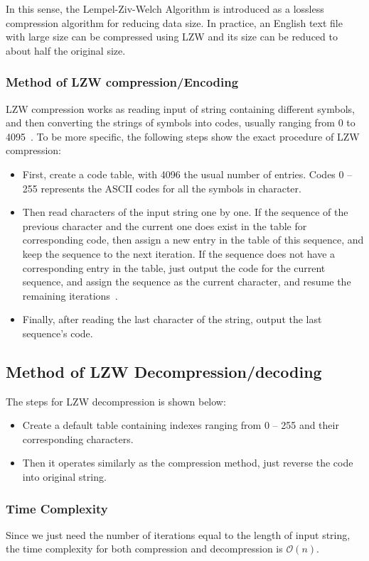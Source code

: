\documentclass[catalog.tex]{subfiles}
\begin{document}
In this sense, the Lempel-Ziv-Welch Algorithm is introduced as a lossless compression algorithm for reducing data size. In practice, an English text file with large size can be compressed using LZW and its size can be reduced to about half the original size.

\subsubsection*{Method of LZW compression/Encoding}
LZW compression works as reading input of string containing different symbols, and then converting the strings of symbols into codes, usually ranging from 0 to 4095~\cite{ziv_lempel_1978}. To be more specific, the following steps show the exact procedure of LZW compression:
\begin{itemize}
    \item First, create a code table, with 4096 the usual number of entries. Codes 0 -- 255 represents the ASCII codes for all the symbols in character.
    \item Then read characters of the input string one by one. If the sequence of the previous character and the current one does exist in the table for corresponding code, then assign a new entry in the table of this sequence, and keep the sequence to the next iteration. If the sequence does not have a corresponding entry in the table, just output the code for the current sequence, and assign the sequence as the current character, and resume the remaining iterations~\cite{welch_1984}.
    \item Finally, after reading the last character of the string, output the last sequence's code.
\end{itemize}

\subsection*{Method of LZW Decompression/decoding}
The steps for LZW decompression is shown below:
\begin{itemize}
    \item Create a default table containing indexes ranging from 0 -- 255 and their corresponding characters.
    \item Then it operates similarly as the compression method, just reverse the code into original string.
\end{itemize}

\subsubsection*{Time Complexity}
Since we just need the number of iterations equal to the length of input string, the time complexity for both compression and decompression is $\mathcal{O}(n)$.
\end{document}
